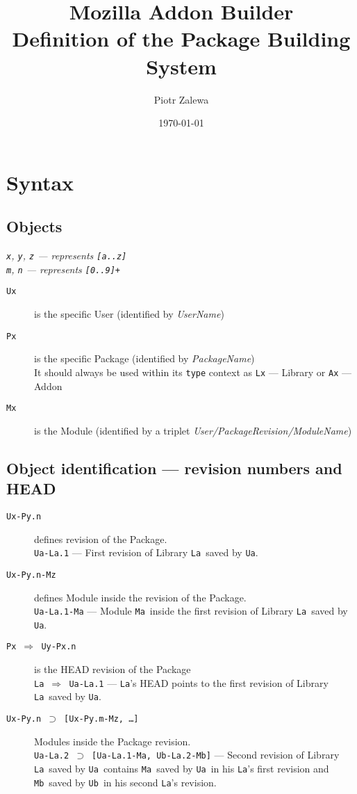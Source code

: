 \documentclass[10pt]{article}
\title{Mozilla Addon Builder\\ Definition of the Package Building System}
\author{Piotr Zalewa}
\date{\today}
\def\Ua{{\tt Ua}}
\def\Ub{{\tt Ub}}
\def\La{{\tt La}}
\def\Ma{{\tt Ma}}
\def\Mb{{\tt Mb}}
\def\headsto{${\Longrightarrow}$ }
\def\hto{\headsto}
\def\eq{${\supset}$ }
\begin{document}
\maketitle

\section{Syntax}

	\subsection{Objects}
	
	{\em \small {\tt x}, {\tt y}, {\tt z} --- represents {\tt [a..z]}\\
	{\tt m}, {\tt n} --- represents {\tt [0..9]+}}
	
	\begin{description}
		\item[{\tt Ux}] is the specific User (identified by {\em UserName})
		\item[{\tt Px}] is the specific Package (identified by {\em PackageName})\\
			It should always be used within its {\tt type} context as {\tt Lx} --- Library or {\tt Ax} --- Addon
		\item[{\tt Mx}] is the Module (identified by a triplet {\em User/PackageRevision/ModuleName})
	\end{description}

	\subsection{Object identification --- revision numbers and HEAD}
	\begin{description}
		\item[{\tt Ux-Py.n}] defines revision of the Package.\\ 
			{\tt Ua-La.1} --- First revision of Library \La\ saved by \Ua.
		\item[{\tt Ux-Py.n-Mz}] defines Module inside the revision of the Package. \\ 
			{\tt Ua-La.1-Ma} --- Module \Ma\ inside the first revision of Library \La\ saved by \Ua.
		\item[{\tt Px \hto  Uy-Px.n}] is the HEAD revision of the Package\\ 
			{\tt La \hto  Ua-La.1} --- \La's HEAD points to the first revision of Library \La\ saved by \Ua.
		\item[{\tt Ux-Py.n \eq [Ux-Py.m-Mz, \ldots]}] Modules inside the Package revision.\\ 
			{\tt Ua-La.2 \eq [Ua-La.1-Ma, Ub-La.2-Mb]} --- Second revision of Library \La\ saved by \Ua\ contains \Ma\ saved by \Ua\ in his \La's first revision and \Mb\ saved by \Ub\ in his second \La's revision.
	\end{description}
\end{document}
